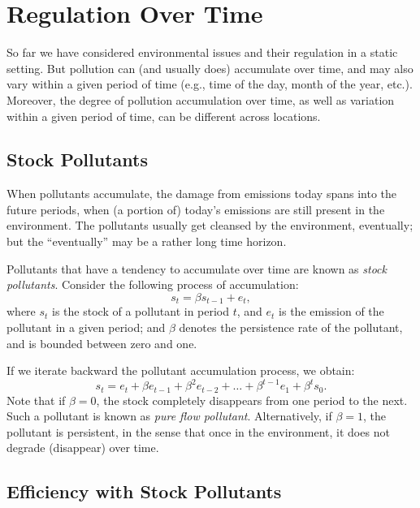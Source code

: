 \documentclass[
]{book}
\begin{document}
\hypertarget{regulation-over-time}{%
\chapter{Regulation Over Time}\label{regulation-over-time}}

So far we have considered environmental issues and their regulation in a static setting. But pollution can (and usually does) accumulate over time, and may also vary within a given period of time (e.g., time of the day, month of the year, etc.). Moreover, the degree of pollution accumulation over time, as well as variation within a given period of time, can be different across locations.

\hypertarget{stock-pollutants}{%
\section{Stock Pollutants}\label{stock-pollutants}}

When pollutants accumulate, the damage from emissions today spans into the future periods, when (a portion of) today's emissions are still present in the environment. The pollutants usually get cleansed by the environment, eventually; but the ``eventually'' may be a rather long time horizon.

Pollutants that have a tendency to accumulate over time are known as \emph{stock pollutants}. Consider the following process of accumulation: \[s_t=\beta s_{t-1}+e_t,\] where \(s_t\) is the stock of a pollutant in period \(t\), and \(e_t\) is the emission of the pollutant in a given period; and \(\beta\) denotes the persistence rate of the pollutant, and is bounded between zero and one.

If we iterate backward the pollutant accumulation process, we obtain:
\[s_t = e_t + \beta e_{t-1} + \beta^2 e_{t-2} + \ldots + \beta^{t-1}e_1 + \beta^t s_0.\]
Note that if \(\beta=0\), the stock completely disappears from one period to the next. Such a pollutant is known as \emph{pure flow pollutant}. Alternatively, if \(\beta=1\), the pollutant is persistent, in the sense that once in the environment, it does not degrade (disappear) over time.

\hypertarget{efficiency-with-stock-pollutants}{%
\section{Efficiency with Stock Pollutants}\label{efficiency-with-stock-pollutants}}
\end{document}
